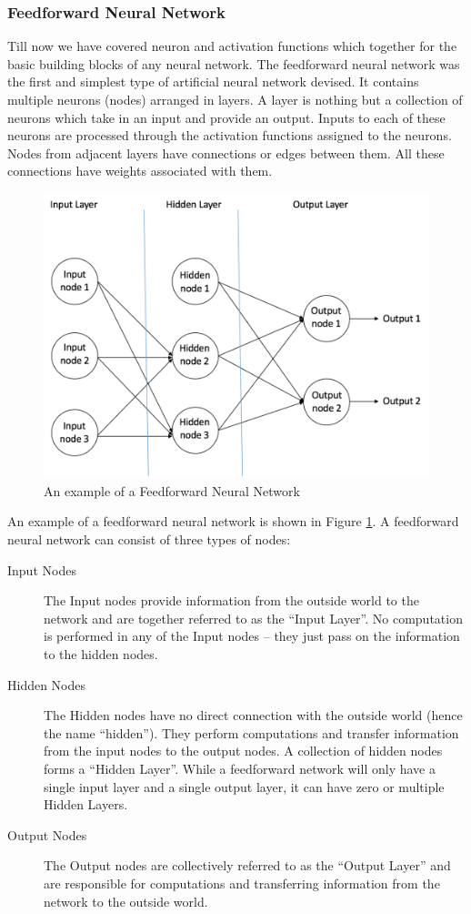 \documentclass{report}
\begin{document}
\subsubsection{Feedforward Neural Network}
Till now we have covered neuron and activation functions which together for the basic building blocks of any neural network. The feedforward
neural network was the first and simplest type of artificial neural network devised. It contains multiple neurons (nodes) arranged in layers.
A layer is nothing but a collection of neurons which take in an input and provide an output. Inputs to each of these neurons are processed
through the activation functions assigned to the neurons. Nodes from adjacent layers have connections or edges between them. All these connections have weights associated with them.
\begin{figure}[h]
  \centering
  \includegraphics[scale=1.0]{feedforwardnetwork}
  \caption{An example of a Feedforward Neural Network}
  \label{fig:feedforwardnetwork}
\end{figure}
An example of a feedforward neural network is shown in Figure \ref{fig:feedforwardnetwork}. A feedforward neural network can consist of three types of nodes:
\begin{description}
\item[ Input Nodes ] The Input nodes provide information from the outside world to the network and are together referred to as the
  “Input Layer”. No computation is performed in any of the Input nodes – they just pass on the information to the hidden nodes.
\item[  Hidden Nodes ]  The Hidden nodes have no direct connection with the outside world (hence the name “hidden”). They perform
  computations and transfer information from the input nodes to the output nodes. A collection of hidden nodes forms a “Hidden Layer”.
  While a feedforward network will only have a single input layer and a single output layer, it can have zero or multiple Hidden Layers.
\item [ Output Nodes ] The Output nodes are collectively referred to as the “Output Layer” and are responsible for computations and
  transferring information from the network to the outside world.
\end{description}
\end{document}
